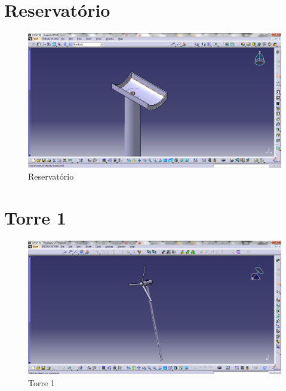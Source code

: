 \section{Reservatório}	
\begin{figure}[!htbp]
	  \centering
	  \includegraphics[scale=0.45]{editaveis/figuras/C_Reservatorio}
	  \caption[Reservatório]{Reservatório}
	  \label{Reservatorio}
	\end{figure}
	\FloatBarrier

\section{Torre 1}
\begin{figure}[!htbp]
	  \centering
	  \includegraphics[scale=0.45]{editaveis/figuras/C_torre1}
	  \caption[Torre1]{Torre 1}
	  \label{Torre1}
	\end{figure}
	\FloatBarrier

